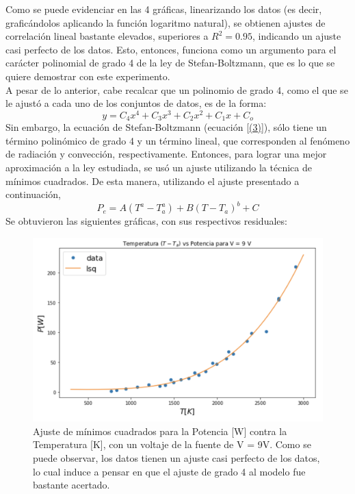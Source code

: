 \documentclass[%
 reprint,
 amsmath,amssymb,
 aps,
]{revtex4-1}
\begin{document}
Como se puede evidenciar en las 4 gráficas, linearizando los datos (es decir, graficándolos aplicando la función logaritmo natural), se obtienen ajustes de correlación lineal bastante elevados, superiores a $R^{2} = 0.95$, indicando un ajuste casi perfecto de los datos. Esto, entonces, funciona como un argumento para el carácter polinomial de grado 4 de la ley de Stefan-Boltzmann, que es lo que se quiere demostrar con este experimento. \\

A pesar de lo anterior, cabe recalcar que un polinomio de grado 4, como el que se le ajustó a cada uno de los conjuntos de datos, es de la forma: 
\begin{equation}\label{(10)}
    y = C_{4}x^4 + C_{3}x^3 + C_{2}x^2 + C_{1}x + C_{o}
\end{equation}
Sin embargo, la ecuación de Stefan-Boltzmann (ecuación \eqref{(3)}), sólo tiene un término polinómico de grado 4  y un término lineal, que corresponden al fenómeno de radiación y convección, respectivamente. Entonces, para lograr una mejor aproximación a la ley estudiada, se usó un ajuste utilizando la técnica de mínimos cuadrados. De esta manera, utilizando el ajuste presentado a continuación,
\begin{equation}
    P_{e} = A(T^a - T_{a}^a) + B(T - T_{a})^b + C
\end{equation}
Se obtuvieron las siguientes gráficas, con sus respectivos residuales:

\begin{figure}[H]
    \centering
    \includegraphics[scale= 0.3]{graf1lsq.png}
    \caption{Ajuste de mínimos cuadrados para la Potencia [W] contra la Temperatura [K], con un voltaje de la fuente de V = 9V. Como se puede observar, los datos tienen un ajuste casi perfecto de los datos, lo cual induce a pensar en que el ajuste de grado 4 al modelo fue bastante acertado.}
    \label{fig:graf1lsq}
\end{figure}
\end{document}
